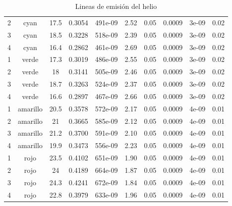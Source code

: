 \documentclass[11pt, a4paper, twocolumn]{article}
\begin{document}
\begin{table}[h]
{\begin{tabular}{cccccccccc}
           2 & cyan        &         17.5 &       0.3054 &  491e-09 &   2.52 &               0.05 &               0.0009 &    3e-09 &   0.02 \\
           3 & cyan        &         18.5 &       0.3228 &  518e-09 &   2.39 &               0.05 &               0.0009 &    3e-09 &   0.02 \\
           4 & cyan        &         16.4 &       0.2862 &  461e-09 &   2.69 &               0.05 &               0.0009 &    3e-09 &   0.02 \\
           1 & verde       &         17.3 &       0.3019 &  486e-09 &   2.55 &               0.05 &               0.0009 &    3e-09 &   0.02 \\
           2 & verde       &         18   &       0.3141 &  505e-09  &   2.46 &               0.05 &               0.0009 &    3e-09 &   0.02 \\
           3 & verde       &         18.7 &       0.3263 &  524e-09 &   2.37 &               0.05 &               0.0009 &    3e-09 &   0.02 \\
           4 & verde       &         16.6 &       0.2897 &  467e-09  &   2.66 &               0.05 &               0.0009 &    3e-09 &   0.02 \\
           1 & amarillo    &         20.5 &       0.3578 &  572e-09  &   2.17 &               0.05 &               0.0009 &    4e-09 &   0.01 \\
           2 & amarillo    &         21   &       0.3665 &  585e-09 &   2.12 &               0.05 &               0.0009 &    4e-09 &   0.01 \\
           3 & amarillo    &         21.2 &       0.3700 &  591e-09 &   2.10 &               0.05 &               0.0009 &    4e-09 &   0.01 \\
           4 & amarillo    &         19.9 &       0.3473 &  556e-09 &   2.23 &               0.05 &               0.0009 &    4e-09 &   0.01 \\
           1 & rojo        &         23.5 &       0.4102 &  651e-09 &   1.90 &               0.05 &               0.0009 &    4e-09 &   0.01  \\
           2 & rojo        &         24   &       0.4189 &  664e-09 &   1.87 &               0.05 &               0.0009 &    4e-09 &   0.01 \\
           3 & rojo        &         24.3 &       0.4241 &  672e-09 &   1.84 &               0.05 &               0.0009 &    4e-09 &   0.01 \\
           4 & rojo        &         22.8 &       0.3979 &  633e-09 &   1.96  &               0.05 &               0.0009 &    4e-09 &   0.01 \\
\hline


\end{tabular}
   }
\caption{Lineas de emisión del helio}
\label{tab: TablaHe}

\end{table}
\end{document}
